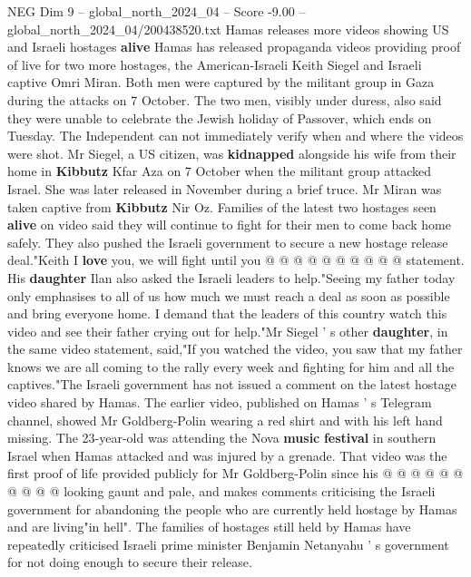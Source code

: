 \begin{textsample}{NEG Dim 9 – global\_north\_2024\_04 – Score -9.00 – global\_north\_2024\_04/200438520.txt}  \label{ex:f9_neg_261}
Hamas releases more videos showing US and Israeli hostages \textbf{alive} Hamas has released propaganda videos providing proof of live for two more hostages, the American-Israeli Keith Siegel and Israeli captive Omri Miran.
Both men were captured by the militant group in Gaza during the attacks on 7 October.
The two men, visibly under duress, also said they were unable to celebrate the Jewish holiday of Passover, which ends on Tuesday.
The Independent can not immediately verify when and where the videos were shot.
Mr Siegel, a US citizen, was \textbf{kidnapped} alongside his wife from their home in \textbf{Kibbutz} Kfar Aza on 7 October when the militant group attacked Israel.
She was later released in November during a brief truce.
Mr Miran was taken captive from \textbf{Kibbutz} Nir Oz.
Families of the latest two hostages seen \textbf{alive} on video said they will continue to fight for their men to come back home safely.
They also pushed the Israeli government to secure a new hostage release deal."Keith I \textbf{love} you, we will fight until you @ @ @ @ @ @ @ @ @ @ statement.
His \textbf{daughter} Ilan also asked the Israeli leaders to help."Seeing my father today only emphasises to all of us how much we must reach a deal as soon as possible and bring everyone home.
I demand that the leaders of this country watch this video and see their father crying out for help."Mr Siegel ' s other \textbf{daughter}, in the same video statement, said,"If you watched the video, you saw that my father knows we are all coming to the rally every week and fighting for him and all the captives."The Israeli government has not issued a comment on the latest hostage video shared by Hamas.
The earlier video, published on Hamas ' s Telegram channel, showed Mr Goldberg-Polin wearing a red shirt and with his left hand missing.
The 23-year-old was attending the Nova \textbf{music} \textbf{festival} in southern Israel when Hamas attacked and was injured by a grenade.
That video was the first proof of life provided publicly for Mr Goldberg-Polin since his @ @ @ @ @ @ @ @ @ @ looking gaunt and pale, and makes comments criticising the Israeli government for abandoning the people who are currently held hostage by Hamas and are living"in hell".
The families of hostages still held by Hamas have repeatedly criticised Israeli prime minister Benjamin Netanyahu ' s government for not doing enough to secure their release.

\end{textsample}
